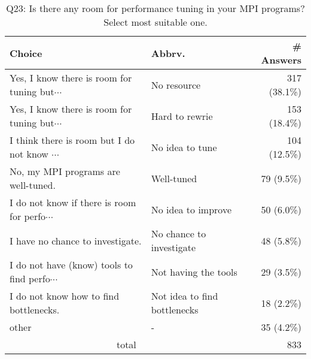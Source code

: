 \begin{table}[htb]%
\begin{center}%
\caption{Q23: Is there any room for performance tuning in your MPI programs? Select most suitable one.}%
\label{tab:Q23-ans}%
\begin{tabular}{l|l|r}%
\hline%
Choice & Abbrv. & \# Answers \\%
\hline%
{\small Yes, I know there is room for tuning but$\cdots$} & No resource & 317 (38.1\%) \\%
{\small Yes, I know there is room for tuning but$\cdots$} & Hard to rewrie & 153 (18.4\%) \\%
{\small I think there is room but I do not know $\cdots$} & No idea to tune & 104 (12.5\%) \\%
No, my MPI programs are well-tuned. & Well-tuned & 79 (9.5\%) \\%
{\small I do not know if there is room for perfo$\cdots$} & No idea to improve & 50 (6.0\%) \\%
I have no chance to investigate. & No chance to investigate & 48 (5.8\%) \\%
{\small I do not have (know) tools to find perfo$\cdots$} & Not having the tools & 29 (3.5\%) \\%
I do not know how to find bottlenecks. & Not idea to find bottlenecks & 18 (2.2\%) \\%
other & - & 35 (4.2\%) \\%
\hline%
\multicolumn{2}{c}{total} & 833 \\%
\hline%
\end{tabular}%
\end{center}%
\end{table}%

